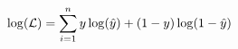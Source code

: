 \documentclass[preview]{standalone}
\begin{document}
\begin{align*}
\special{dvisvgm:raw <g id='unique000'>}\log(\mathcal{L})=\sum^n_{i=1}y\log(\hat{y})+(1-y)\log(1-\hat{y})\special{dvisvgm:raw </g>}
\end{align*}
\end{document}
